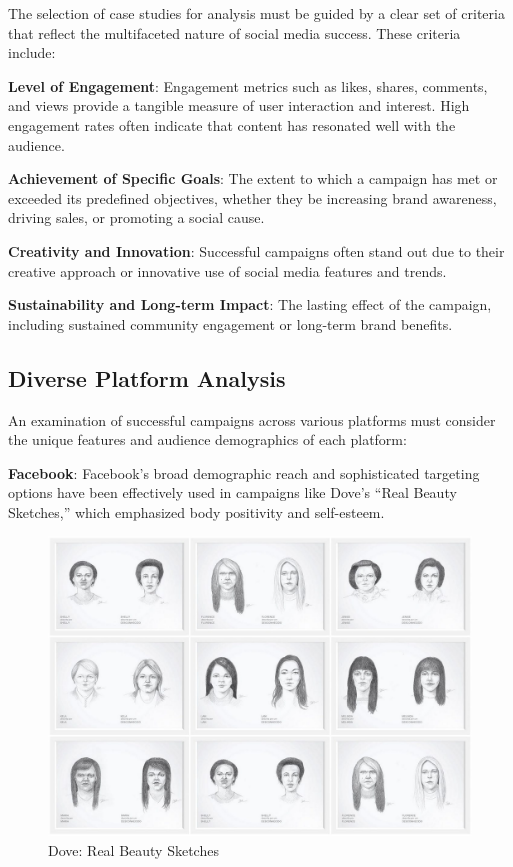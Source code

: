 \documentclass[
]{book}
\begin{document}
The selection of case studies for analysis must be guided by a clear set of criteria that reflect the multifaceted nature of social media success. These criteria include:

\textbf{Level of Engagement}: Engagement metrics such as likes, shares, comments, and views provide a tangible measure of user interaction and interest. High engagement rates often indicate that content has resonated well with the audience.

\textbf{Achievement of Specific Goals}: The extent to which a campaign has met or exceeded its predefined objectives, whether they be increasing brand awareness, driving sales, or promoting a social cause.

\textbf{Creativity and Innovation}: Successful campaigns often stand out due to their creative approach or innovative use of social media features and trends.

\textbf{Sustainability and Long-term Impact}: The lasting effect of the campaign, including sustained community engagement or long-term brand benefits.

\hypertarget{diverse-platform-analysis}{%
\subsection{Diverse Platform Analysis}\label{diverse-platform-analysis}}

An examination of successful campaigns across various platforms must consider the unique features and audience demographics of each platform:

\textbf{Facebook}: Facebook's broad demographic reach and sophisticated targeting options have been effectively used in campaigns like Dove's ``Real Beauty Sketches,'' which emphasized body positivity and self-esteem.

\begin{figure}
\centering
\includegraphics[width=1\textwidth,height=\textheight]{images/dove.jpg}
\caption{Dove: Real Beauty Sketches}
\end{figure}
\end{document}
